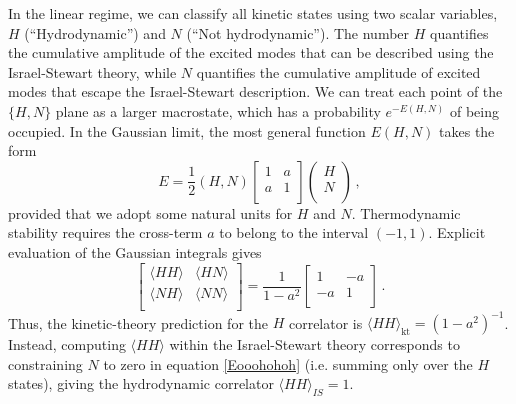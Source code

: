 \documentclass[aps,prd,preprint,nofootinbib,amsmath,amssymb,showpacs,longbibliography,singlecolumn,superscriptaddress,10pt]{revtex4-1}
\theoremstyle{plain}
\theoremstyle{definition}
\begin{document}
In the linear regime, we can classify all kinetic states using two scalar variables, $H$ (``Hydrodynamic'') and $N$ (``Not hydrodynamic''). The number $H$ quantifies the cumulative amplitude of the excited modes that can be described using the Israel-Stewart theory, while $N$ quantifies the cumulative amplitude of excited modes that escape the Israel-Stewart description. We can treat each point of the $\{H,N\}$ plane as a larger macrostate, which has a probability $e^{-E(H,N)}$ of being occupied. In the Gaussian limit, the most general function $E(H,N)$ takes the form
\begin{equation}\label{Eooohohoh}
    E = \dfrac{1}{2} (H,N) 
    \begin{bmatrix}
        1 & a \\
        a & 1 \\
    \end{bmatrix} 
    \begin{pmatrix}
        H \\
        N \\
    \end{pmatrix} \, ,
\end{equation}
provided that we adopt some natural units for $H$ and $N$. Thermodynamic stability requires the cross-term $a$ to belong to the interval $(-1,1)$. Explicit evaluation of the Gaussian integrals gives
\begin{equation}
    \begin{bmatrix}
        \langle HH \rangle & \langle HN \rangle \\
        \langle NH \rangle & \langle NN \rangle \\
    \end{bmatrix} = \dfrac{1}{1-a^2}
    \begin{bmatrix}
        1 & -a \\
        -a & 1 \\
    \end{bmatrix} \, .
\end{equation}
Thus, the kinetic-theory prediction for the $H$ correlator is $\langle HH\rangle_{\text{kt}}=(1{-}a^2)^{-1}$. Instead, computing $\langle HH\rangle$ within the Israel-Stewart theory corresponds to constraining $N$ to zero in equation \eqref{Eooohohoh} (i.e. summing only over the $H$ states), giving the hydrodynamic correlator $\langle HH \rangle_{IS} =1$. 
\end{document}
